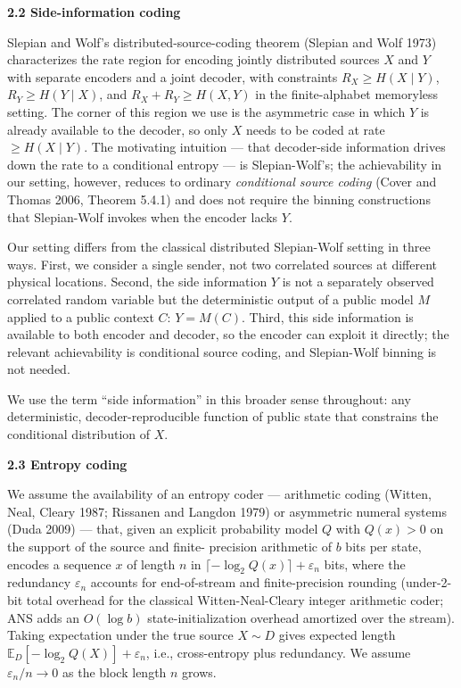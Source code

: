 \documentclass[
]{article}
\begin{document}
\textbf{2.2 Side-information coding}

Slepian and Wolf's distributed-source-coding theorem (Slepian and
Wolf 1973) characterizes the rate region for encoding jointly
distributed sources $X$ and $Y$ with separate encoders and a joint
decoder, with constraints $R_X \geq H(X \mid Y)$,
$R_Y \geq H(Y \mid X)$, and $R_X + R_Y \geq H(X, Y)$ in the
finite-alphabet memoryless setting. The corner of this region we use
is the asymmetric case in which $Y$ is already available to the
decoder, so only $X$ needs to be coded at rate
$\geq H(X \mid Y)$. The motivating intuition --- that decoder-side
information drives down the rate to a conditional entropy --- is
Slepian-Wolf's; the achievability in our setting, however, reduces
to ordinary \emph{conditional source coding} (Cover and Thomas 2006,
Theorem 5.4.1) and does not require the binning constructions that
Slepian-Wolf invokes when the encoder lacks $Y$.

Our setting differs from the classical distributed Slepian-Wolf
setting in three ways. First, we consider a single sender, not two
correlated sources at different physical locations. Second, the side
information $Y$ is not a separately observed correlated random
variable but the deterministic output of a public model $M$ applied
to a public context $C$: $Y = M(C)$. Third, this side information is
available to both encoder and decoder, so the encoder can exploit it
directly; the relevant achievability is conditional source coding,
and Slepian-Wolf binning is not needed.

We use the term ``side information'' in this broader sense
throughout: any deterministic, decoder-reproducible function of
public state that constrains the conditional distribution of $X$.

\textbf{2.3 Entropy coding}

We assume the availability of an entropy coder --- arithmetic coding
(Witten, Neal, Cleary 1987; Rissanen and Langdon 1979) or asymmetric
numeral systems (Duda 2009) --- that, given an explicit probability
model $Q$ with $Q(x) > 0$ on the support of the source and finite-
precision arithmetic of $b$ bits per state, encodes a sequence $x$ of
length $n$ in $\lceil -\log_2 Q(x) \rceil + \varepsilon_n$ bits,
where the redundancy $\varepsilon_n$ accounts for end-of-stream and
finite-precision rounding (under-2-bit total overhead for the
classical Witten-Neal-Cleary integer arithmetic coder; ANS adds an
$O(\log b)$ state-initialization overhead amortized over the stream).
Taking expectation under the true source $X \sim D$ gives expected
length $\mathbb{E}_D[-\log_2 Q(X)] + \varepsilon_n$, i.e.,
cross-entropy plus redundancy. We assume $\varepsilon_n / n \to 0$
as the block length $n$ grows.
\end{document}
